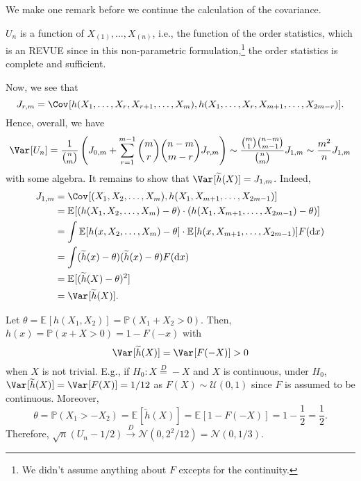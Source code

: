 We make one remark before we continue the calculation of the covariance.
\begin{remark}
	\(U_n\) is a function of \(X_{(1)}, \dots , X_{(n)}\), i.e., the function of the order statistics, which is an REVUE since in this non-parametric formulation,\footnote{We didn't assume anything about \(F\) excepts for the continuity.} the order statistics is complete and sufficient.
\end{remark}

Now, we see that
\[
	J_{r, m}
	= \Cov_{}[h(X_1, \dots , X_r, X_{r+1}, \dots , X_m), h(X_1, \dots , X_r, X_{m+1}, \dots , X_{2m-r})].
\]
Hence, overall, we have
\[
	\Var_{}[U_n]
	= \frac{1}{\binom{n}{m}} \left( J_{0, m} + \sum_{r=1}^{m-1} \binom{m}{r} \binom{n-m}{m-r} J_{r, m} \right)
	\sim \frac{\binom{m}{1} \binom{n-m}{m-1}}{\binom{n}{m}} J_{1, m}
	\sim \frac{m^2}{n} J_{1, m}
\]
with some algebra. It remains to show that \(\Var_{}[\widetilde{h} (X)] = J_{1, m}\). Indeed,
\[
	\begin{split}
		J_{1, m}
		 & = \Cov_{}[(X_1, X_2, \dots , X_m), h(X_1, X_{m+1}, \dots , X_{2m-1})]                                                       \\
		 & = \mathbb{E}_{}[(h(X_1, X_2, \dots , X_m) - \theta ) \cdot (h(X_1, X_{m+1}, \dots , X_{2m-1}) - \theta ) ]                  \\
		 & = \int \mathbb{E}_{}[h(x, X_2, \dots , X_m) - \theta ] \cdot \mathbb{E}_{}[h(x, X_{m+1}, \dots , X_{2m-1})] F(\mathrm{d} x) \\
		 & = \int (\widetilde{h} (x) - \theta ) (\widetilde{h} (x) - \theta ) F(\mathrm{d} x)                                          \\
		 & = \mathbb{E}_{}[(\widetilde{h} (X) - \theta )^2]                                                                            \\
		 & = \Var_{}[\widetilde{h} (X)] .
	\end{split}
\]

\begin{eg}
	Let \(\theta = \mathbb{E}_{}[h(X_1, X_2)] = \mathbb{P} (X_1 + X_2 > 0)\). Then, \(h(x) = \mathbb{P} (x + X > 0) = 1 - F(-x)\) with
	\[
		\Var_{}[\widetilde{h} (X)]
		= \Var_{}[F(-X)]
		> 0
	\]
	when \(X\) is not trivial. E.g., if \(H_0 \colon X \overset{D}{=} -X \) and \(X\) is continuous, under \(H_0\), \(\Var_{}[\widetilde{h} (X)] = \Var_{}[F(X)] = 1 / 12\) as \(F(X) \sim \mathcal{U} (0, 1)\) since \(F\) is assumed to be continuous. Moreover,
	\[
		\theta
		= \mathbb{P} (X_1 > -X_2)
		= \mathbb{E}_{}[\widetilde{h} (X)]
		= \mathbb{E}_{}[1 - F(-X)]
		= 1 - \frac{1}{2}
		= \frac{1}{2}.
	\]
	Therefore, \(\sqrt{n} ( U_n - 1 / 2 ) \overset{D}{\to} \mathcal{N} ( 0, 2^2 / 12 ) = \mathcal{N} ( 0, 1 / 3 ) \).
\end{eg}

